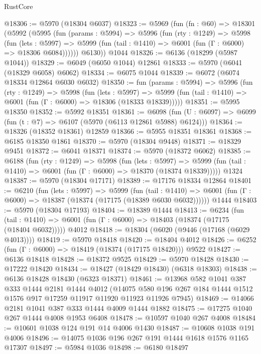 \begin{lexlean}{RustCore}
\begin{coremodule}
@18306 := @5970 (@18304 @6037)
@18323 := @5969
    (fun (fn : @60) =>
    @18301
      (@5992
        (@5995
          (fun (params : @5994) =>
          @5996
            (fun (rty : @1249) =>
            @5998
              (fun (lets : @5997) =>
              @5999 (fun (tail : @1410) => @6001 (fun (Γ : @6000) => @18306 @6084))))))
        @6130))
    @1044
@18326 := @6136 (@18299 (@5987 @1044))
@18329 := @6049 (@6050 @1044) @12861
@18333 := @5970 (@6041 (@18329 @6058) @6062)
@18334 := @6075 @1044
@18339 := @6072 (@6074 @18334 @12864 @6030 @6032)
@18350 := fun (params : @5994) =>
  @5996
    (fun (rty : @1249) =>
    @5998
      (fun (lets : @5997) =>
      @5999 (fun (tail : @1410) => @6001 (fun (Γ : @6000) => @18306 (@18333 @18339)))))
@18351 := @5995 @18350
@18352 := @5992 @18351
@18361 := @6098
    (fun (U : @6097) => @6099 (fun (t : @7) => @6107 (@5970 (@6113 @12861 @5988) @6124)))
@18364 := @18326 (@18352 @18361) @12859
@18366 := @5955 @18351 @18361
@18368 := @6185 @18350 @1861
@18370 := @5970 (@18304 @9448)
@18371 := @18329 @9451
@18372 := @6041 @18371
@18374 := @5970 (@18372 @6062)
@18385 := @6188
    (fun (rty : @1249) =>
    @5998
      (fun (lets : @5997) =>
      @5999 (fun (tail : @1410) => @6001 (fun (Γ : @6000) => @18370 (@18374 @18339)))))
    @1324
@18387 := @5970 (@18304 @17171)
@18389 := @17176 @18334 @12864
@18401 := @6210
    (fun (lets : @5997) =>
    @5999
      (fun (tail : @1410) =>
      @6001 (fun (Γ : @6000) => @18387 (@18374 (@17175 (@18389 @6030 @6032))))))
    @1444
@18403 := @5970 (@18304 @17193)
@18404 := @18389 @1444
@18413 := @6234
    (fun (tail : @1410) => @6001 (fun (Γ : @6000) => @18403 (@18374 (@17175 (@18404 @6032)))))
    @4012
@18418 := @18304 (@6020 (@9446 (@17168 (@6029 @4013))))
@18419 := @5970 @18418
@18420 := @18404 @4012
@18426 := @6252 (fun (Γ : @6000) => @18419 (@18374 (@17175 @18420))) @9522
@18427 := @6136 @18418
@18428 := @18372 @9525
@18429 := @5970 @18428
@18430 := @17222 @18420
@18434 := @18427 (@18429 @18430) (@6318 @18303)
@18438 := @6136 @18428 @18430 (@6323 @18371)
@18461 := @13968
    @582
    @1041
    @387
    @333
    @1444
    @2181
    @1444
    @4012
    (@14075 @580 @196 @267 @184 @1444 @1512 @1576 @917 @17259 @11917 @11920 @11923 @11926 @7945)
@18469 := @14066 @2181 @1041 @387 @333 @1444 @4009 @1444 @1882
@18475 := @17275 @1040 @267 @1444 @4008 @1953 @6408
@18478 := @10597 @1040 @267 @4008
@18484 := @10601 @1038 @124 @191 @14 @4006 @1430
@18487 := @10608 @1038 @191 @4006
@18496 := @14075 @1036 @196 @267 @191 @1444 @1618 @1576 @1165 @17307
@18497 := @5984 @1036
@18498 := @6180 @18497

\end{coremodule}
\end{lexlean}
